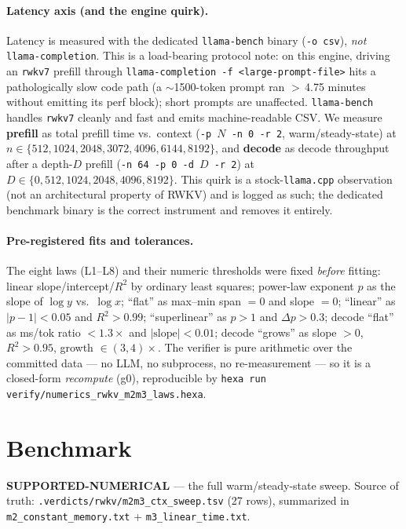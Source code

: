 \documentclass[11pt,a4paper]{article}
\newcommand{\green}[1]{\textcolor{green!50!black}{\textbf{#1}}}
\newcommand{\ctx}{\ensuremath{n}}
\begin{document}
\paragraph{Latency axis (and the engine quirk).}
Latency is measured with the dedicated \texttt{llama-bench} binary
(\texttt{-o csv}), \emph{not} \texttt{llama-completion}. This is a load-bearing
protocol note: on this engine, driving an \texttt{rwkv7} prefill through
\texttt{llama-completion -f <large-prompt-file>} hits a pathologically slow code
path (a \(\sim\)1500-token prompt ran \(>\)\,4.75 minutes without emitting its
perf block); short prompts are unaffected. \texttt{llama-bench} handles
\texttt{rwkv7} cleanly and fast and emits machine-readable CSV. We measure
\textbf{prefill} as total prefill time vs.\ context (\texttt{-p $N$ -n 0 -r 2},
warm/steady-state) at \(\ctx \in \{512,1024,2048,3072,4096,6144,8192\}\), and
\textbf{decode} as decode throughput after a depth-\(D\) prefill
(\texttt{-n 64 -p 0 -d $D$ -r 2}) at \(D \in \{0,512,1024,2048,4096,8192\}\).
This quirk is a stock-\texttt{llama.cpp} observation (not an architectural
property of RWKV) and is logged as such; the dedicated benchmark binary is the
correct instrument and removes it entirely.

\paragraph{Pre-registered fits and tolerances.}
The eight laws (L1--L8) and their numeric thresholds were fixed \emph{before}
fitting: linear slope/intercept/\(R^2\) by ordinary least squares; power-law
exponent \(p\) as the slope of \(\log y\) vs.\ \(\log x\); ``flat'' as max--min
span \(=0\) and slope \(=0\); ``linear'' as \(|p-1|<0.05\) and \(R^2>0.99\);
``superlinear'' as \(p>1\) and \(\Delta p>0.3\); decode ``flat'' as
ms/tok ratio \(<1.3\times\) and \(|\text{slope}|<0.01\); decode ``grows'' as
slope \(>0\), \(R^2>0.95\), growth \(\in(3,4)\times\). The verifier is pure
arithmetic over the committed data --- no LLM, no subprocess, no re-measurement
--- so it is a closed-form \emph{recompute} (g0), reproducible by
\texttt{hexa run verify/numerics\_rwkv\_m2m3\_laws.hexa}.

\section{Benchmark}
\label{sec:benchmark}
\green{SUPPORTED-NUMERICAL} --- the full warm/steady-state sweep. Source of truth:
\texttt{.verdicts/rwkv/m2m3\_ctx\_sweep.tsv} (27 rows), summarized in
\texttt{m2\_constant\_memory.txt} + \texttt{m3\_linear\_time.txt}.
\end{document}
